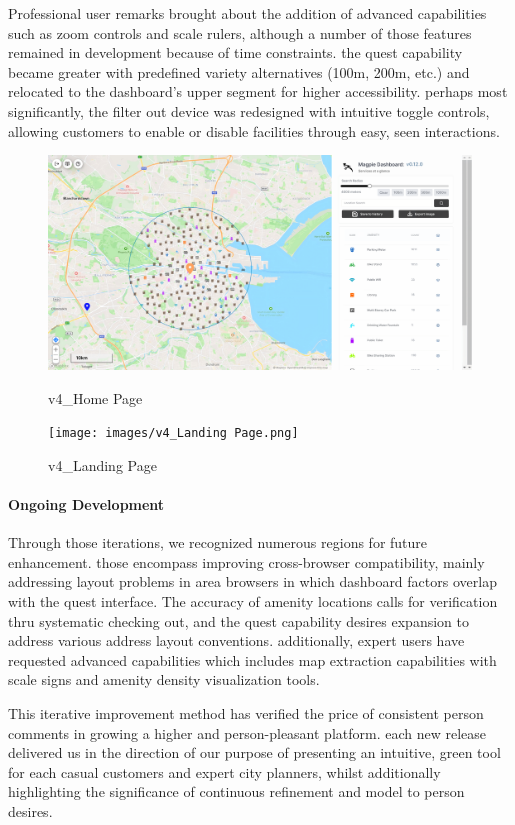Professional user remarks brought about the addition of advanced capabilities such as zoom controls and scale rulers, although a number of those features remained in development because of time constraints. the quest capability became greater with predefined variety alternatives (100m, 200m, etc.) and relocated to the dashboard's upper segment for higher accessibility. perhaps most significantly, the filter out device was redesigned with intuitive toggle controls, allowing customers to enable or disable facilities through easy, seen interactions.
\begin{figure}[h]
    \centering
    \begin{minipage}{0.48\textwidth}
        \centering
        \includegraphics[width=\textwidth]{images/v4_Home.png}
        \caption{v4\_Home Page}
        \label{fig:v4_Home Page}
    \end{minipage}
    \hfill
    \begin{minipage}{0.48\textwidth}
        \centering
        \texttt{[image: images/v4\_Landing Page.png]}
        \caption{v4\_Landing Page}
        \label{fig:v4_Landing Page}
    \end{minipage}
\end{figure}

\paragraph{Ongoing Development}

Through those iterations, we recognized numerous regions for future enhancement. those encompass improving cross-browser compatibility, mainly addressing layout problems in area browsers in which dashboard factors overlap with the quest interface. The accuracy of amenity locations calls for verification thru systematic checking out, and the quest capability desires expansion to address various address layout conventions. additionally, expert users have requested advanced capabilities which includes map extraction capabilities with scale signs and amenity density visualization tools.

This iterative improvement method has verified the price of consistent person comments in growing a higher and person-pleasant platform. each new release delivered us in the direction of our purpose of presenting an intuitive, green tool for each casual customers and expert city planners, whilst additionally highlighting the significance of continuous refinement and model to person desires.


